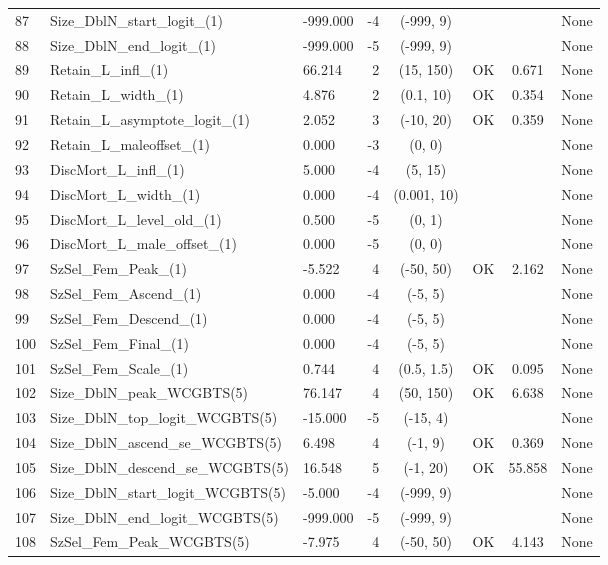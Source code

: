 \documentclass[12pt,]{article}
\begin{document}
\begin{landscape}
\begin{longtable}{lp{2.5in}lrcccl}
  87 & Size\_DblN\_start\_logit\_(1) & -999.000 & -4 & (-999, 9) &  &  & None \\ 
  88 & Size\_DblN\_end\_logit\_(1) & -999.000 & -5 & (-999, 9) &  &  & None \\ 
  89 & Retain\_L\_infl\_(1) & 66.214 & 2 & (15, 150) & OK & 0.671 & None \\ 
  90 & Retain\_L\_width\_(1) & 4.876 & 2 & (0.1, 10) & OK & 0.354 & None \\ 
  91 & Retain\_L\_asymptote\_logit\_(1) & 2.052 & 3 & (-10, 20) & OK & 0.359 & None \\ 
  92 & Retain\_L\_maleoffset\_(1) & 0.000 & -3 & (0, 0) &  &  & None \\ 
  93 & DiscMort\_L\_infl\_(1) & 5.000 & -4 & (5, 15) &  &  & None \\ 
  94 & DiscMort\_L\_width\_(1) & 0.000 & -4 & (0.001, 10) &  &  & None \\ 
  95 & DiscMort\_L\_level\_old\_(1) & 0.500 & -5 & (0, 1) &  &  & None \\ 
  96 & DiscMort\_L\_male\_offset\_(1) & 0.000 & -5 & (0, 0) &  &  & None \\ 
  97 & SzSel\_Fem\_Peak\_(1) & -5.522 & 4 & (-50, 50) & OK & 2.162 & None \\ 
  98 & SzSel\_Fem\_Ascend\_(1) & 0.000 & -4 & (-5, 5) &  &  & None \\ 
  99 & SzSel\_Fem\_Descend\_(1) & 0.000 & -4 & (-5, 5) &  &  & None \\ 
  100 & SzSel\_Fem\_Final\_(1) & 0.000 & -4 & (-5, 5) &  &  & None \\ 
  101 & SzSel\_Fem\_Scale\_(1) & 0.744 & 4 & (0.5, 1.5) & OK & 0.095 & None \\ 
  102 & Size\_DblN\_peak\_WCGBTS(5) & 76.147 & 4 & (50, 150) & OK & 6.638 & None \\ 
  103 & Size\_DblN\_top\_logit\_WCGBTS(5) & -15.000 & -5 & (-15, 4) &  &  & None \\ 
  104 & Size\_DblN\_ascend\_se\_WCGBTS(5) & 6.498 & 4 & (-1, 9) & OK & 0.369 & None \\ 
  105 & Size\_DblN\_descend\_se\_WCGBTS(5) & 16.548 & 5 & (-1, 20) & OK & 55.858 & None \\ 
  106 & Size\_DblN\_start\_logit\_WCGBTS(5) & -5.000 & -4 & (-999, 9) &  &  & None \\ 
  107 & Size\_DblN\_end\_logit\_WCGBTS(5) & -999.000 & -5 & (-999, 9) &  &  & None \\ 
  108 & SzSel\_Fem\_Peak\_WCGBTS(5) & -7.975 & 4 & (-50, 50) & OK & 4.143 & None \\ 

\end{longtable}
\end{landscape}
\end{document}
